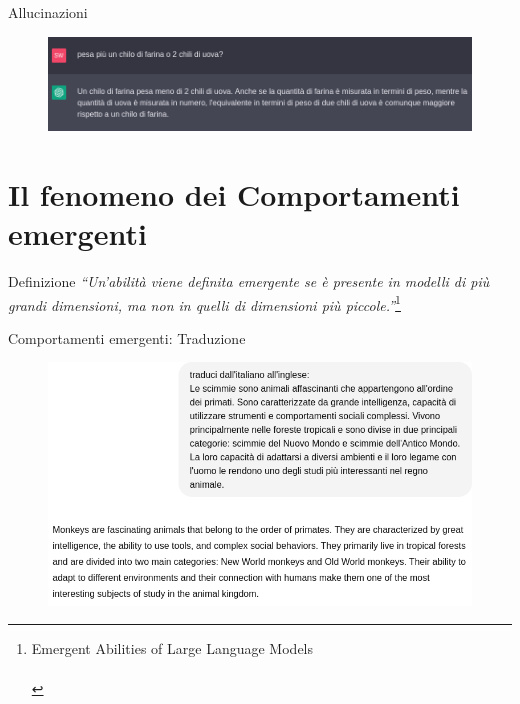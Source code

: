 \documentclass{beamer}
\begin{document}
\begin{frame}{Allucinazioni}
    \begin{figure}
        \centering
        \includegraphics[width=1.0\linewidth]{imgs/chatgpt_all_2.png}
    \end{figure}
\end{frame}

\section{Il fenomeno dei Comportamenti emergenti}

\begin{frame}{Definizione}
  \textit{``Un'abilit\`a viene definita emergente se \`e presente in modelli di pi\`u grandi dimensioni, ma non in quelli di dimensioni pi\`u piccole.''}\footnote{Emergent Abilities of Large Language Models\\ \ \\}
\end{frame}

\begin{frame}{Comportamenti emergenti: Traduzione}
    \begin{figure}
        \centering
        \includegraphics[width=.8\linewidth]{imgs/emergent/gpt_monkey2.png}
    \end{figure}
\end{frame}
\end{document}
